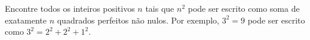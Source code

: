 Encontre todos os inteiros positivos $n$ tais que $n^2$ pode ser escrito como soma de exatamente $n$ quadrados perfeitos não nulos. Por exemplo, $3^2 = 9$ pode ser escrito como $3^2 = 2^2 + 2^2 + 1^2$.
